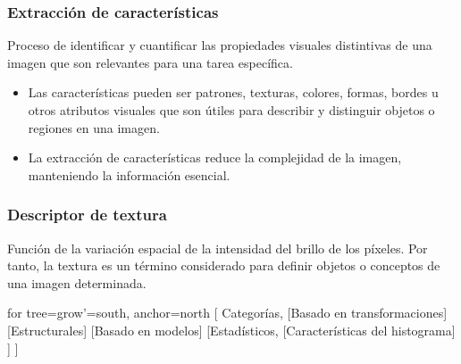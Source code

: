 \documentclass[
10pt, %
aspectratio=169, %
]{beamer}
\begin{document}
	\begin{frame}
		
		\frametitle{Extracción de características}
		
		\begin{alertblock}{}
			Proceso de identificar y cuantificar las propiedades visuales distintivas de una imagen que son relevantes para una tarea específica.
		\end{alertblock}
		
		\vspace{1\baselineskip}
		
		\begin{itemize}
			\item Las características pueden ser patrones, texturas, colores, formas, bordes u otros atributos visuales que son útiles para describir y distinguir objetos o regiones en una imagen.
			
			\item La extracción de características reduce la complejidad de la imagen, manteniendo la información esencial.
			
		\end{itemize}
			
	\end{frame}
	
	\begin{frame}
		
		\frametitle{Descriptor de textura}
		
		\begin{alertblock}{}
			Función de la variación espacial de la intensidad del brillo de los píxeles. Por tanto, la textura es un término considerado para definir objetos o conceptos de una imagen determinada.
		\end{alertblock}
		
		\pause
		\vspace{1\baselineskip}
		\centering
		\begin{forest}
			for tree={grow'=south, anchor=north}
			[ Categorías, 
			[Basado en transformaciones]
			[Estructurales]
			[Basado en modelos]
			[Estadísticos,
			[Características del histograma]
			] 
			]
		\end{forest}\\[2mm]
		
		
	\end{frame}
	
\end{document}
